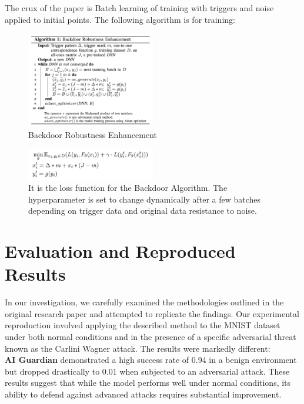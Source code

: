 \documentclass[letterpaper,twocolumn,10pt]{article}
\begin{document}
The crux of the paper is Batch learning of training with triggers and noise applied to initial points.
The following algorithm is for training:

    \begin{figure}[htbp]
      \centering
      \includegraphics[width=0.5\textwidth]{1.png}
      \caption{Backdoor Robustness Enhancement}
      \label{fig:my_label}
    \end{figure}



    \begin{figure}[htbp]
      \centering
      \includegraphics[width=0.5\textwidth]{2.png}
      \caption{It is the loss function for the Backdoor Algorithm. The hyperparameter is set to change dynamically after a few batches depending on trigger data and original data resistance to noise.}
      \label{fig:my_label}
    \end{figure}

\section{Evaluation and Reproduced Results}

In our investigation, we carefully examined the methodologies outlined in the original research paper and attempted to replicate the findings. Our experimental reproduction involved applying the described method to the MNIST dataset under both normal conditions and in the presence of a specific adversarial threat known as the Carlini Wagner attack. The results were markedly different:\\ 
\textbf{AI Guardian} \cite{aiGuardian} demonstrated a high success rate of 0.94 in a benign environment but dropped drastically to 0.01 when subjected to an adversarial attack. These results suggest that while the model performs well under normal conditions, its ability to defend against advanced attacks requires substantial improvement.
\end{document}

